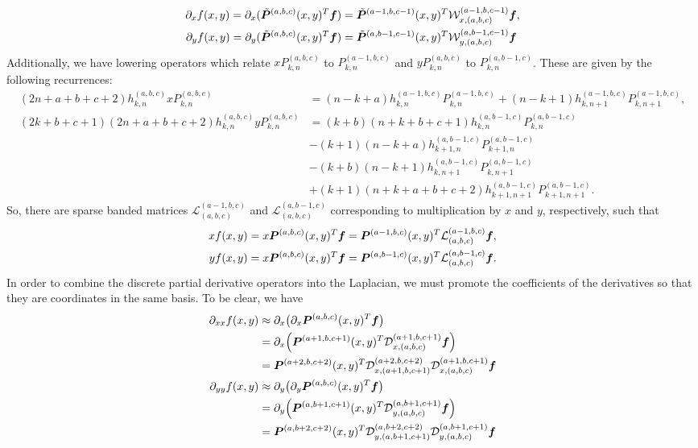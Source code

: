 \begin{align}
	\partial_x f(x,y) = \partial_x (\tilde{\boldsymbol{P}}^{(a,b,c)}(x,y)^T\boldsymbol{f}) &= \tilde{\boldsymbol{P}}^{(a-1,b,c-1)}(x,y)^T \mathcal{W}_{x,(a,b,c)}^{(a-1,b,c-1)}\boldsymbol{f},\\
	\partial_y f(x,y) = \partial_y (\tilde{\boldsymbol{P}}^{(a,b,c)}(x,y)^T\boldsymbol{f}) &= \tilde{\boldsymbol{P}}^{(a,b-1,c-1)}(x,y)^T \mathcal{W}_{y,(a,b,c)}^{(a,b-1,c-1)}\boldsymbol{f}
\end{align}
Additionally, we have lowering operators which relate $xP_{k,n}^{(a,b,c)}$ to $P_{k,n}^{(a-1,b,c)}$ and $yP_{k,n}^{(a,b,c)}$ to $P_{k,n}^{(a,b-1,c)}$. These are given by the following recurrences:
\begin{align}
(2n+a+b+c+2)h_{k,n}^{(a,b,c)}xP_{k,n}^{(a,b,c)} &= (n-k+a)h_{k,n}^{(a-1,b,c)}P_{k,n}^{(a-1,b,c)} + (n-k+1)h_{k,n+1}^{(a-1,b,c)}P_{k,n+1}^{(a-1,b,c)},\\
(2k+b+c+1)(2n+a+b+c+2)h_{k,n}^{(a,b,c)}yP_{k,n}^{(a,b,c)} &= (k+b)(n+k+b+c+1)h_{k,n}^{(a,b-1,c)}P_{k,n}^{(a,b-1,c)} \nonumber \\
&-(k+1)(n-k+a)h_{k+1,n}^{(a,b-1,c)}P_{k+1,n}^{(a,b-1,c)} \nonumber \\
&-(k+b)(n-k+1)h_{k,n+1}^{(a,b-1,c)}P_{k,n+1}^{(a,b-1,c)} \nonumber \\
&+(k+1)(n+k+a+b+c+2)h_{k+1,n+1}^{(a,b-1,c)}P_{k+1,n+1}^{(a,b-1,c)}.
\end{align}
So, there are sparse banded matrices $\mathcal{L}_{(a,b,c)}^{(a-1,b,c)}$ and $\mathcal{L}_{(a,b,c)}^{(a,b-1,c)}$ corresponding to multiplication by $x$ and $y$, respectively, such that
\begin{align}
	xf(x,y) &= x\boldsymbol{P}^{(a,b,c)}(x,y)^T\boldsymbol{f} = \boldsymbol{P}^{(a-1,b,c)}(x,y)^T\mathcal{L}_{(a,b,c)}^{(a-1,b,c)}\boldsymbol{f},\\
	yf(x,y) &= x\boldsymbol{P}^{(a,b,c)}(x,y)^T\boldsymbol{f} = \boldsymbol{P}^{(a,b-1,c)}(x,y)^T\mathcal{L}_{(a,b,c)}^{(a,b-1,c)}\boldsymbol{f}.
\end{align}
In order to combine the discrete partial derivative operators into the Laplacian, we must promote the coefficients of the derivatives so that they are coordinates in the same basis. To be clear, we have
\begin{align*}
	\partial_{xx}f(x,y) &\approx \partial_x\big(\partial_x \boldsymbol{P}^{(a,b,c)}(x,y)^T\boldsymbol{f}\big) \\
	&= \partial_x\Big(\boldsymbol{P}^{(a+1,b,c+1)}(x,y)^T \mathcal{D}_{x,(a,b,c)}^{(a+1,b,c+1)}\boldsymbol{f}\Big) \\
	&= \boldsymbol{P}^{(a+2,b,c+2)}(x,y)^T\mathcal{D}_{x,(a+1,b,c+1)}^{(a+2,b,c+2)}\mathcal{D}_{x,(a,b,c)}^{(a+1,b,c+1)}\boldsymbol{f}\\
	\partial_{yy}f(x,y) &\approx \partial_y\big(\partial_y \boldsymbol{P}^{(a,b,c)}(x,y)^T\boldsymbol{f}\big) \\
	&= \partial_y\Big(\boldsymbol{P}^{(a,b+1,c+1)}(x,y)^T \mathcal{D}_{y,(a,b,c)}^{(a,b+1,c+1)}\boldsymbol{f}\Big) \\
	&= \boldsymbol{P}^{(a,b+2,c+2)}(x,y)^T\mathcal{D}_{y,(a,b+1,c+1)}^{(a,b+2,c+2)}\mathcal{D}_{y,(a,b,c)}^{(a,b+1,c+1)}\boldsymbol{f}
\end{align*}  
